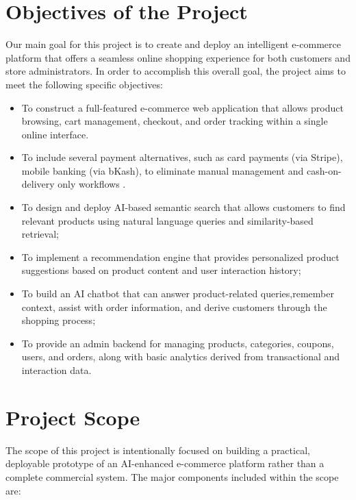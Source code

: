 \section{Objectives of the Project}
Our main goal for this project is to create and deploy an intelligent e-commerce platform that offers a seamless online shopping experience for both customers and store administrators. In order to accomplish this overall goal, the project aims to meet the following specific objectives: 

\begin{itemize}
  \item To construct a full-featured e-commerce web application that allows product browsing, cart management, checkout, and order tracking within a single online interface. 
  \item To include several payment alternatives, such as card payments (via Stripe), mobile banking (via bKash), to eliminate manual management and cash-on-delivery only workflows \cite{hasan2021mobile}.
  \item To design and deploy AI-based semantic search that allows customers to find relevant products using natural language queries and similarity-based retrieval;
  \item To implement a recommendation engine that provides personalized product suggestions based on product content and user interaction history;
  \item To build an AI chatbot that can answer product-related queries,remember context, assist with order information, and derive customers through the shopping process;
  \item To provide an admin backend for managing products, categories, coupons, users, and orders, along with basic analytics derived from transactional and interaction data.
\end{itemize}

\section{Project Scope}
The scope of this project is intentionally focused on building a practical, deployable prototype of an AI-enhanced e-commerce platform rather than a complete commercial system. The major components included within the scope are:

